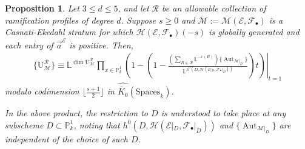 \documentclass[12 pt]{amsart}
\newcommand{\rboxed}[1]{#1}
\theoremstyle{plain}
\newtheorem{proposition}[theorem]{Proposition}
\theoremstyle{definition}
\theoremstyle{remark}
\numberwithin{equation}{section}
\newcommand\bl{\mathbb L}
\newcommand\bp{\mathbb P}
\newcommand\sce{\mathscr E}
\newcommand\scf{\mathscr F}
\newcommand\sch{\mathscr H}
\newcommand\ce{\mathscr M} %
\newcommand\ramlocus[2]{\mathrm{U}_{#1}^{#2}} %
\newcommand\grcSpaces{\widehat{\widetilde{K_0}}(\mathrm{Spaces}_k)} %
\DeclareMathOperator\aut{Aut}
\begin{document}
\begin{proposition}
	\label{proposition:ce-strata-class} Let $3 \leq d \leq 5$, and let
	$\mathcal R$ be an allowable collection of ramification profiles of
	degree $d$.  Suppose $s \geq 0$ and $\rboxed{\ce} := \ce(\sce,
	\scf_\bullet)$ is a Casnati-Ekedahl stratum for which $\sch(\sce,
	\scf_\bullet)(-s)$ is globally generated and each entry of $\vec a^\sce$
	is positive.  Then,
	\begin{align} \label{equation:smooth-sieve} \{\ramlocus \ce {\mathcal R}\}
		\equiv \bl^{\dim \ramlocus \ce {\mathcal R}} \prod_{x \in
		\bp^1_k} \left. \left( 1- \left( 1 - \frac{\left( \sum_{R \in
			\mathcal R} \bl^{-r(R)} \right)
\{\aut_{\ce|_D}\}}{\bl^{h^0(D, \sch(\sce|_D, \scf_\bullet|_D))}  } \right) t
\right) \right\rvert_{t =1} \end{align} 
modulo codimension
$\lfloor
\frac{s + 1}{2} \rfloor$
in $\grcSpaces$.

In the above product, the restriction to
$D$ is understood to take place at any subscheme $D \subset \bp^1_k$, noting
that $h^0(D, \sch(\sce|_D, \scf_\bullet|_D))$ and 
$\{\aut_{\ce|_D}\}$
are independent of the choice
of such $D$.
\end{proposition} 
\end{document}
